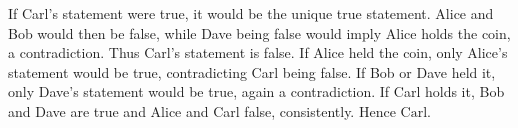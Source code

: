If Carl's statement were true, it would be the unique true statement. Alice and Bob would then be false, while Dave being false would imply Alice holds the coin, a contradiction. Thus Carl's statement is false. If Alice held the coin, only Alice's statement would be true, contradicting Carl being false. If Bob or Dave held it, only Dave's statement would be true, again a contradiction. If Carl holds it, Bob and Dave are true and Alice and Carl false, consistently. Hence $\boxed{\text{Carl}}$.
